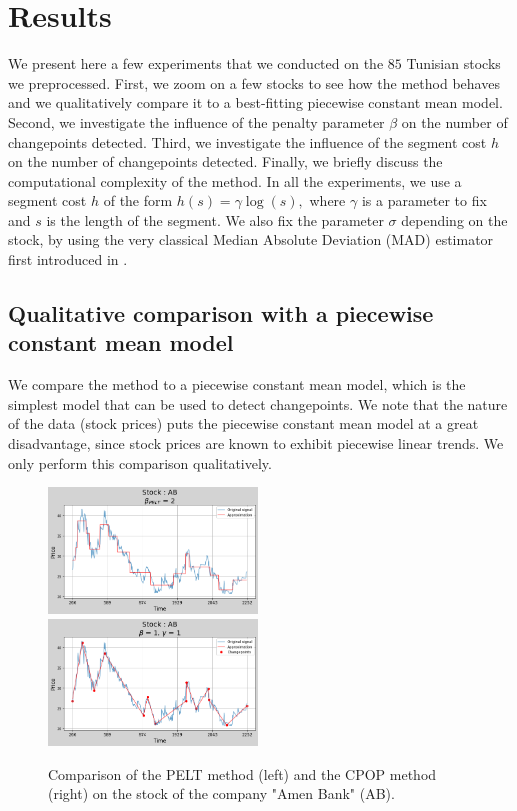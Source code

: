 \documentclass[11pt]{article}
\begin{document}
\section{Results}
We present here a few experiments that we conducted on the $85$ Tunisian stocks we preprocessed. First, we zoom on a few stocks to see how the method behaves and we qualitatively compare it to a best-fitting piecewise constant mean model. Second, we investigate the influence of the penalty parameter $\beta$ on the number of changepoints detected. Third, we investigate the influence of the segment cost $h$ on the number of changepoints detected. Finally, we briefly discuss the computational complexity of the method.
\jump
In all the experiments, we use a segment cost $h$ of the form $ h(s) = \gamma \log(s), $ where $\gamma$ is a parameter to fix and $s$ is the length of the segment. We also fix the parameter $\sigma$ depending on the stock, by using the very classical Median Absolute Deviation (MAD) estimator first introduced in \cite{hampel1974}.
\subsection{Qualitative comparison with a piecewise constant mean model}
We compare the method to a piecewise constant mean model, which is the simplest model that can be used to detect changepoints. We note that the nature of the data (stock prices) puts the piecewise constant mean model at a great disadvantage, since stock prices are known to exhibit piecewise linear trends. We only perform this comparison qualitatively.
\begin{figure}[h]
    \centering
    \includegraphics[width=0.495\textwidth]{figures/comparaison CPOP PELT/PELT.png}
    \includegraphics[width=0.495\textwidth]{figures/comparaison CPOP PELT/CPOP.png}
    \caption{Comparison of the PELT method (left) and the CPOP method (right) on the stock of the company "Amen Bank" (AB).}
    \label{fig:comparison}
\end{figure}
\end{document}
